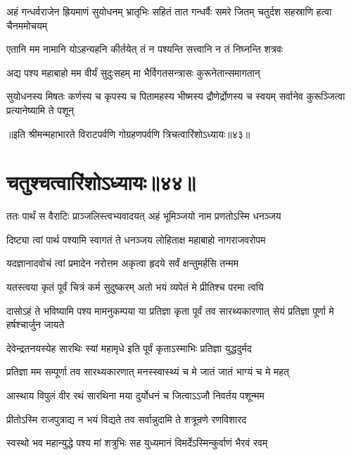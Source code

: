 \threelineshloka
{अहं गन्धर्वराजेन ह्रियमाणं सुयोधनम्}
{भ्रातृभिः सहितं तात गन्धर्वैः समरे जितम्}
{चतुर्दश सहस्राणि हत्वा चैनममोचयम्}


\twolineshloka
{एतानि मम नामानि योऽहन्यहनि कीर्तयेत्}
{तं न पश्यन्ति सत्त्वानि न तं निघ्नन्ति शत्रवः}


\twolineshloka
{अद्य पश्य महाबाहो मम वीर्यं सुदुःसहम्}
{मा भैर्विगतसन्त्रासः कुरूनेतान्समागतान्}


\threelineshloka
{सुयोधनस्य मिषतः कर्णस्य च कृपस्य च}
{पितामहस्य भीष्मस्य द्रौणेर्द्रोणस्य च स्वयम्}
{सर्वानेव कुरूञ्जित्वा प्रत्यानेष्यामि ते पशून्}

॥इति श्रीमन्महाभारते विराटपर्वणि गोग्रहणपर्वणि त्रिचत्वारिंशोऽध्यायः॥४३॥

\chapter{चतुश्चत्वारिंशोऽध्यायः॥४४॥}

\twolineshloka
{ततः पार्थं स वैराटिः प्राञ्जलिस्त्वभ्यवादयत्}
{अहं भूमिञ्जयो नाम प्रणतोऽस्मि धनञ्जय}


\twolineshloka
{दिष्ट्या त्वां पार्थ पश्यामि स्वागतं ते धनञ्जय}
{लोहिताक्ष महाबाहो नागराजवरोपम}


\twolineshloka
{यदज्ञानादवोचं त्वां प्रमादेन नरोत्तम}
{अकृत्वा हृदये सर्वं क्षन्तुमर्हसि तन्मम}


\twolineshloka
{यतस्त्वया कृतं पूर्वं चित्रं कर्म सुदुष्करम्}
{अतो भयं व्यपेतं मे प्रीतिश्च परमा त्वयि}


\onelineshloka
{दासोऽहं ते भविष्यामि पश्य मामनुकम्पया}
\twolineshloka
{या प्रतिज्ञा कृता पूर्वं तव सारथ्यकारणात्}
{सेयं प्रतिज्ञा पूर्णा मे हर्षश्चार्जुन जायते}


\twolineshloka
{देवेन्द्रतनयस्येह सारथिः स्यां महामृधे}
{इति पूर्वं कृताऽस्माभिः प्रतिज्ञा युद्धदुर्मद}


\twolineshloka
{प्रतिज्ञा मम सम्पूर्णा तव सारथ्यकारणात्}
{मनस्स्वास्थ्यं च मे जातं जातं भाग्यं च मे महत्}


\twolineshloka
{आस्थाय विपुलं वीर रथं सारथिना मया}
{दुर्योधनं च जित्वाऽऽजौ निवर्तय पशून्मम}




\twolineshloka
{प्रीतोऽस्मि राजपुत्राद्य न भयं विद्यते तव}
{सर्वान्नुदामि ते शत्रून्रणे रणविशारद}


\twolineshloka
{स्वस्थो भव महान्युद्धे पश्य मां शत्रुभिः सह}
{युध्यमानं विमर्देऽस्मिन्कुर्वाणं भैरवं रवम्}


